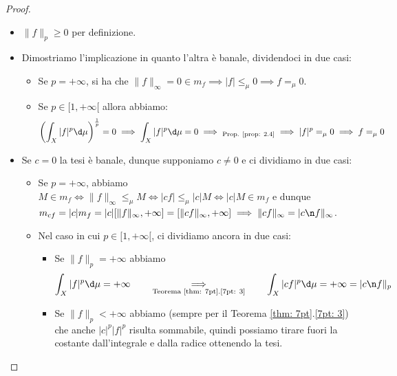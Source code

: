 \begin{proof}
    \begin{itemize}
        \item $\|f\|_p \ge 0$ per definizione.
        \item Dimostriamo l'implicazione \say{$\Rarr$} in quanto l'altra è banale, dividendoci in due casi: \begin{itemize}
            \item Se $p = + \infty$, si ha che $\|f\|_\infty = 0 \in m_f \implies |f|\le_\mu 0 \implies f =_\mu 0$.
            \item Se $p \in [1,+\infty[$ allora abbiamo: \[\left(\int_{X}|f|^p \d\mu\right)^\frac{1}{p} = 0 \implies \int_{X}|f|^p \d\mu = 0 \implies_{\text{Prop. \ref{prop: 2.4}}} \implies |f|^p =_\mu 0 \implies f =_\mu 0\]
        \end{itemize}
        \item Se $c=0$ la tesi è banale, dunque supponiamo $c\neq0$ e ci dividiamo in due casi: \begin{itemize}
            \item Se $p = + \infty$, abbiamo $M\in m_f \iff \|f\|_\infty \le_\mu M \iff |cf|\le_\mu |c|M \iff |c|M \in m_f$ e dunque $m_{cf} = |c|m_f = |c|[\|f\|_\infty,+\infty] = [\|cf\|_\infty,+\infty] \implies \|cf\|_\infty = |c\n f\|_\infty$.
            \item Nel caso in cui $p \in [1,+\infty[$, ci dividiamo ancora in due casi:\begin{itemize}
                \item Se $\|f\|_p = +\infty$ abbiamo \[\int_X |f|^p \d\mu = +\infty \qquad\underset{\text{Teorema \ref{thm: 7pt}.\ref{7pt: 3}}}{\implies}\qquad \int_{X} |cf|^p \d\mu = + \infty = |c\n f\|_p\]
                \item Se $\|f\|_p < +\infty$ abbiamo (sempre per il Teorema \ref{thm: 7pt}.\ref{7pt: 3}) che anche $|c|^p|f|^p$ risulta sommabile, quindi possiamo tirare fuori la costante dall'integrale e dalla radice ottenendo la tesi.\qedhere
            \end{itemize}
        \end{itemize}
    \end{itemize}
\end{proof}

